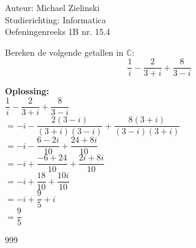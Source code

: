 \documentclass[a4paper]{article}
\begin{document}
  
\noindent \large Auteur: Michael Zielinski \\
\noindent \large Studierichting: Informatica\\
\noindent \large Oefeningenreeks 1B nr. 15.4\\

\medskip

\normalsize
	Bereken de volgende getallen in $\mathbb{C}$:
	\begin{equation*}
		\dfrac{1}{i} - \dfrac{2}{3 + i} + \dfrac{8}{3 - i}
	\end{equation*}
	
	
	\textbf{Oplossing:}\\
	
	$ \dfrac{1}{i} - \dfrac{2}{3 + i} + \dfrac{8}{3 - i} $ \\	
	
	$ = -i - \dfrac{2(3 - i)}{(3 + i)(3 - i)} + \dfrac{8(3 + i)}{(3 - i)(3 + i)} $ \\	
	
	$ = -i - \dfrac{6 - 2i}{10} + \dfrac{24 + 8i}{10} $ \\	
	
	$ = -i + \dfrac{-6 + 24}{10} + \dfrac{2i + 8i}{10} $ \\	
	
	$ = -i + \dfrac{18}{10} + \dfrac{10i}{10} $ \\	
	
	$ = -i + \dfrac{9}{5} + i $ \\	
	
	$ = \dfrac{9}{5} $ \\
	
\begin{thebibliography}{999}
\end{thebibliography}
\end{document}
